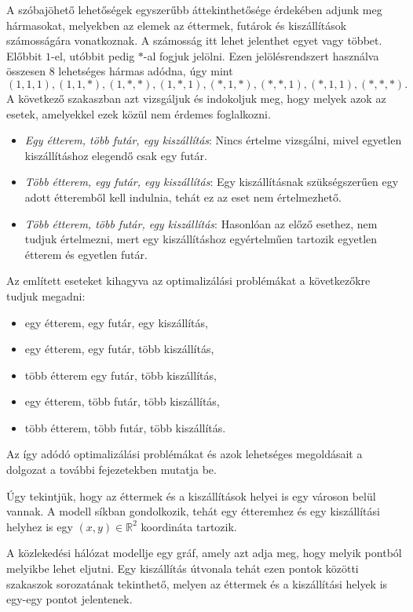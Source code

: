 
A szóbajöhető lehetőségek egyszerűbb áttekinthetősége érdekében adjunk meg hármasokat, melyekben az elemek az éttermek, futárok és kiszállítások számosságára vonatkoznak.
A számosság itt lehet jelenthet egyet vagy többet. Előbbit $1$-el, utóbbit pedig $*$-al fogjuk jelölni.
Ezen jelölésrendszert használva összesen 8 lehetséges hármas adódna, úgy mint
\[
(1, 1, 1),
(1, 1, *),
(1, *, *),
(1, *, 1),
(*, 1, *),
(*, *, 1),
(*, 1, 1),
(*, *, *).
\]
A következő szakaszban azt vizsgáljuk és indokoljuk meg, hogy melyek azok az esetek, amelyekkel ezek közül nem érdemes foglalkozni.


\begin{itemize}
\item \textit{Egy étterem, több futár, egy kiszállítás}:
Nincs értelme vizsgálni, mivel egyetlen kiszállításhoz elegendő csak egy futár.
\item \textit{Több étterem, egy futár, egy kiszállítás}: Egy kiszállításnak szükségszerűen egy adott étteremből kell indulnia, tehát ez az eset nem értelmezhető.
\item \textit{Több étterem, több futár, egy kiszállítás}: Hasonlóan az előző esethez, nem tudjuk értelmezni, mert egy kiszállításhoz egyértelműen tartozik egyetlen étterem és egyetlen futár.
\end{itemize}

Az említett eseteket kihagyva az optimalizálási problémákat a következőkre tudjuk megadni:
\begin{itemize}
\item egy étterem, egy futár, egy kiszállítás,
\item egy étterem, egy futár, több kiszállítás,
\item több étterem egy futár, több kiszállítás,
\item egy étterem, több futár, több kiszállítás,
\item több étterem, több futár, több kiszállítás.
\end{itemize}
Az így adódó optimalizálási problémákat és azok lehetséges megoldásait a dolgozat a további fejezetekben mutatja be.


Úgy tekintjük, hogy az éttermek és a kiszállítások helyei is egy városon belül vannak.
A modell síkban gondolkozik, tehát egy étteremhez és egy kiszállítási helyhez is egy $(x, y) \in \mathbb{R}^2$ koordináta tartozik.

A közlekedési hálózat modellje egy gráf, amely azt adja meg, hogy melyik pontból melyikbe lehet eljutni.
Egy kiszállítás útvonala tehát ezen pontok közötti szakaszok sorozatának tekinthető, melyen az éttermek és a kiszállítási helyek is egy-egy pontot jelentenek.
